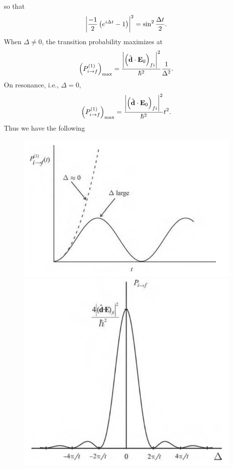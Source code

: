 \documentclass{book}
\theoremstyle{definition}
\newcommand{\f}[2]{\frac{#1}{#2}}
\newcommand{\lp}{\left(}
\newcommand{\rp}{\right)}
\begin{document}
so that
\begin{align}
\abs{ \f{-1}{2}\lp e^{i\Delta t} - 1 \rp }^2 = \sin^2 \f{\Delta t}{2}.
\end{align}
When $\Delta \neq 0$, the transition probability maximizes at
\begin{align}
\lp  P^{(1)}_{i \to f} \rp_{\text{max}} = \f{\abs{\lp \hat{\mathbf{d}}\cdot\mathbf{E}_0 \rp_{fi}}^2}{\hbar^2} \f{1}{\Delta^2}.
\end{align}
On resonance, i.e., $\Delta = 0$,
\begin{align}\label{resonance}
\lp  P^{(1)}_{i \to f} \rp_{\text{max}} = \f{\abs{\lp \hat{\mathbf{d}}\cdot\mathbf{E}_0 \rp_{fi}}^2}{\hbar^2} t^2.
\end{align}
Thus we have the following 
\begin{figure}[!htb]
	\centering
	\includegraphics[scale=0.3]{p}
	\includegraphics[scale=0.3]{t}
\end{figure}
\end{document}
